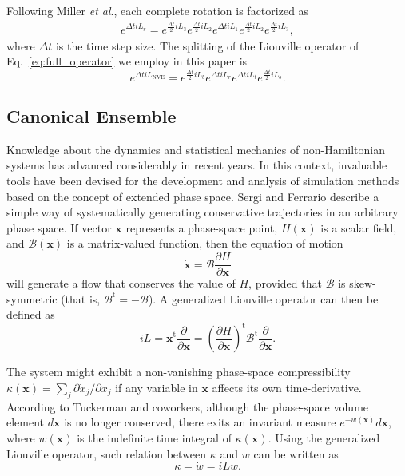 \documentclass[aip,jcp,reprint,amsmath,amssymb]{revtex4-1}
\newcommand{\vt}[1]{\boldsymbol{\mathbf{#1}}}           %
\newcommand{\tr}[1]{#1^\text{t}}                        %
\newcommand{\diff}[2]{\dfrac{\partial #1}{\partial #2}} %
\begin{document}
Following Miller \textit{et al}.,\cite{Miller2002} each complete rotation is factorized as
\begin{align*}
\label{eq:splitting_rot}
e^{\Delta t i\!L_r} =  e^{\frac{\Delta t}{2} i\!L_3} e^{\frac{\Delta t}{2} i\!L_2} e^{\Delta t i\!L_1} e^{\frac{\Delta t}{2} i\!L_2} e^{\frac{\Delta t}{2} i\!L_3},
\end{align*}
where ${\Delta t}$ is the time step size. The splitting of the Liouville operator of Eq.~\eqref{eq:full_operator} we employ in this paper is
\begin{equation}
\label{eq:trotter_splitting_NVE}
e^{\Delta t i\!L_\text{NVE}} = e^{\frac{\Delta t}{2} i\!L_b} e^{\Delta t i\!L_r} e^{\Delta t i\!L_t} e^{\frac{\Delta t}{2} i\!L_b}.
\end{equation}

\subsection{Canonical Ensemble}
\label{sec:canonical}

Knowledge about the dynamics and statistical mechanics of non-Hamiltonian systems has advanced considerably in recent years.\cite{Tuckerman_1999, Tuckerman2001, Sergi2001, Sergi2003, Ezra2004, Sergi2004, Ezra2006, Sergi2010b} In this context, invaluable tools have been devised for the development and analysis of simulation methods based on the concept of extended phase space. Sergi and Ferrario\cite{Sergi2001} describe a simple way of systematically generating conservative trajectories in an arbitrary phase space. If vector $\vt x$ represents a phase-space point, $H(\vt x)$ is a scalar field, and $\boldsymbol{\mathcal B}(\vt x)$ is a matrix-valued function, then the equation of motion
\begin{equation} \label{eq:eq_of_motion}
\dot{\vt x} = \boldsymbol{\mathcal B}\diff{H}{\vt x}
\end{equation}
will generate a flow that conserves the value of $H$, provided that $\boldsymbol{\mathcal B}$ is skew-symmetric (that is, $\tr{ \boldsymbol{ \mathcal B }} = -\boldsymbol{ \mathcal B }$). A generalized Liouville operator can then be defined as\cite{Sergi2004}
\[
i\!L = \tr{\dot{\vt x}}\diff{}{\vt x} = \tr{\left(\diff{H}{\vt x}\right)} \tr{\boldsymbol{\mathcal B}} \diff{}{\vt x}.
\]

The system might exhibit a non-vanishing phase-space compressibility $\kappa(\vt x) = \sum_j \partial \dot{x}_j/\partial x_j$ if any variable in $\vt x$ affects its own time-derivative. According to Tuckerman and coworkers,\cite{Tuckerman_1999, Tuckerman2001} although the phase-space volume element $d\vt x$ is no longer conserved, there exits an invariant measure $e^{-w(\vt x)}d\vt x$, where $w(\vt x)$ is the indefinite time integral of $\kappa(\vt x)$. Using the generalized Liouville operator, such relation between $\kappa$ and $w$ can be written as
\begin{equation}
\label{eq:relation_kappa_w}
\kappa = \dot w = i\!L w.
\end{equation}
\end{document}

